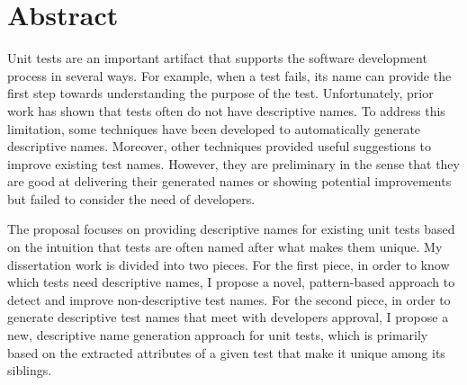 \section*{Abstract}
\label{sec:abstract}

Unit tests are an important artifact that supports the software development process in several ways.
%
For example, when a test fails, its name can provide the first step towards understanding the purpose of the test.
%
Unfortunately, prior work has shown that tests often do not have descriptive names. 
%
To address this limitation, some techniques have been developed to automatically generate descriptive names.
%
Moreover, other techniques provided useful suggestions to improve existing test names.
%
However, they are preliminary in the sense that they are good at delivering their generated names or showing potential improvements but failed to consider the need of developers.


The proposal focuses on providing descriptive names for existing unit tests based on the intuition that tests are often named after what makes them unique.
%
My dissertation work is divided into two pieces.
%
For the first piece, in order to know which tests need descriptive names, I propose a novel, pattern-based approach to detect and improve non-descriptive test names.
%
For the second piece, in order to generate descriptive test names that meet with developers approval, I propose a new, descriptive name generation approach for unit tests, which is primarily based on the extracted attributes of a given test that make it unique among its siblings.